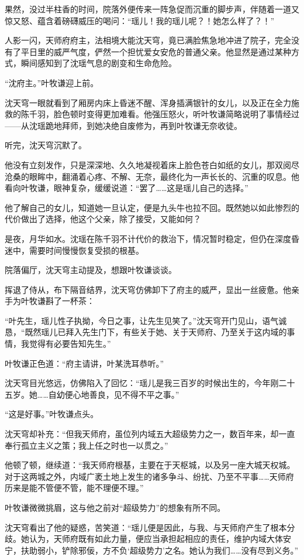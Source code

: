 果然，没过半柱香的时间，院落外便传来一阵急促而沉重的脚步声，伴随着一道又惊又怒、蕴含着磅礴威压的喝问：“瑶儿！我的瑶儿呢？！她怎么样了？！”

人影一闪，天师府府主，法相境大能沈天穹，竟已满脸焦急地冲进了院子，完全没有了平日里的威严气度，俨然一个担忧爱女安危的普通父亲。他显然是通过某种方式，瞬间感知到了沈瑶气息的剧变和生命危险。

“沈府主。”叶牧谦迎上前。

沈天穹一眼就看到了厢房内床上昏迷不醒、浑身插满银针的女儿，以及正在全力施救的陈千羽，脸色顿时变得更加难看。他强压怒火，听叶牧谦简略说明了事情经过——从沈瑶跪地拜师，到她决绝自废修为，再到叶牧谦无奈收徒。

听完，沈天穹沉默了。

他没有立刻发作，只是深深地、久久地凝视着床上脸色苍白如纸的女儿，那双阅尽沧桑的眼眸中，翻涌着心疼、不解、无奈，最终化为一声长长的、沉重的叹息。他看向叶牧谦，眼神复杂，缓缓说道：“罢了……这是瑶儿自己的选择。”

他了解自己的女儿，知道她一旦认定，便是九头牛也拉不回。既然她以如此惨烈的代价做出了选择，他这个父亲，除了接受，又能如何？

是夜，月华如水。沈瑶在陈千羽不计代价的救治下，情况暂时稳定，但仍在深度昏迷中，需要时间慢慢恢复受损的根基。

院落偏厅，沈天穹主动提及，想跟叶牧谦谈谈。

挥退了侍从，布下隔音结界，沈天穹仿佛卸下了府主的威严，显出一丝疲惫。他亲手为叶牧谦斟了一杯茶：

“叶先生，瑶儿性子执拗，今日之事，让先生见笑了。”沈天穹开门见山，语气诚恳，“既然瑶儿已拜入先生门下，有些关于她、关于天师府、乃至关于这内域的事情，我觉得有必要告知先生。”

叶牧谦正色道：“府主请讲，叶某洗耳恭听。”

沈天穹目光悠远，仿佛陷入了回忆：“瑶儿是我三百岁的时候出生的，今年刚二十五岁。她……自幼便心地善良，见不得不平之事。”

“这是好事。”叶牧谦点头。

沈天穹却补充：“但我天师府，虽位列内域五大超级势力之一，数百年来，却一直奉行孤立主义之策；我上任之时也一以贯之。”

他顿了顿，继续道：“我天师府根基，主要在于天枢城，以及另一座大城天权城。对于这两城之外，内域广袤土地上发生的诸多争斗、纷扰、乃至不平事……天师府历来是能不管便不管，能不理便不理。”

叶牧谦微微挑眉，这与他之前对“超级势力”的想象有所不同。

沈天穹看出了他的疑惑，苦笑道：“瑶儿便是因此，与我、与天师府产生了根本分歧。她认为，天师府既有如此力量，便应当承担起相应的责任，维护内域大体安宁，扶助弱小，铲除邪佞，方不负‘超级势力’之名。她认为我们……没有尽到义务。”

